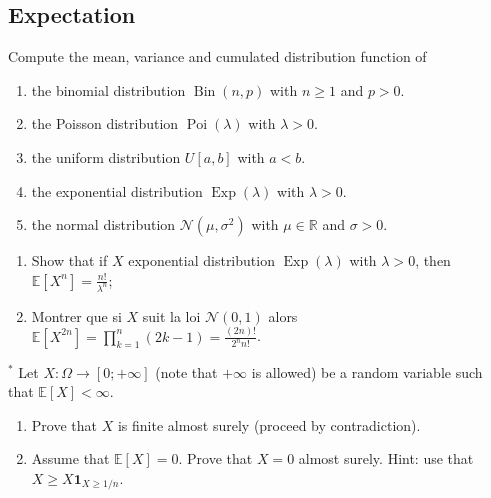 \begin{center}
    \section*{Expectation}
\end{center}

\begin{Exercise}
    Compute the mean, variance and cumulated distribution function of

\begin{enumerate}
  \item the binomial distribution $\operatorname{Bin}(n, p)$ with $n \geq 1$ and $p>0$.

  \item the Poisson distribution $\operatorname{Poi}(\lambda)$ with $\lambda>0$.

  \item the uniform distribution $U[a, b]$ with $a<b$.

  \item the exponential distribution $\operatorname{Exp}(\lambda)$ with $\lambda>0$.

  \item the normal distribution $\mathcal{N}\left(\mu, \sigma^{2}\right)$ with $\mu \in \mathbb{R}$ and $\sigma>0$.

\end{enumerate}
\end{Exercise}

\begin{Exercise}
    \begin{enumerate}
  \item Show that if $X$ exponential distribution $\operatorname{Exp}(\lambda)$ with $\lambda>0$, then $\mathbb{E}\left[X^{n}\right]=\frac{n !}{\lambda^{n}}$;

  \item Montrer que si $X$ suit la loi $\mathcal{N}(0,1)$ alors $\mathbb{E}\left[X^{2 n}\right]=\prod_{k=1}^{n}(2 k-1)=\frac{(2 n) !}{2^{n} n !}$.

\end{enumerate}
\end{Exercise}

\begin{Exercise}
    ${ }^{*}$ Let $X: \Omega \rightarrow[0 ;+\infty]$ (note that $+\infty$ is allowed) be a random variable such that $\mathbb{E}[X]<\infty$.

\begin{enumerate}
  \item Prove that $X$ is finite almost surely (proceed by contradiction).

  \item Assume that $\mathbb{E}[X]=0$. Prove that $X=0$ almost surely. Hint: use that $X \geq X \mathbf{1}_{X \geq 1 / n}$.

\end{enumerate}
\end{Exercise}
